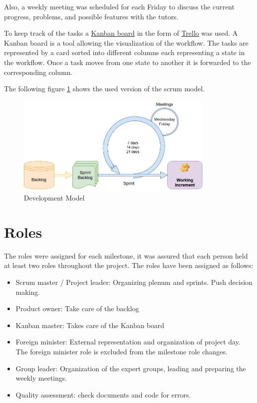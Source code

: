 \documentclass[main.tex]{subfiles}
\begin{document}
	Also, a weekly meeting was scheduled for each Friday to discuss the current progress, problems, and possible features with the tutors.
	
	To keep track of the tasks a \href{https://www.atlassian.com/de/agile/kanban/boards}{Kanban board} in the form of \href{https://trello.com/de}{Trello} was used. A Kanban board is a tool allowing the visualization of the workflow. The tasks are represented by a card sorted into different columns each representing a state in the workflow. Once a task moves from one state to another it is forwarded to the corresponding column.
	
	The following figure \ref{developmentmodel}	shows the used version of the scrum model.
	
	\begin{figure}[h]
		\centering
		\includegraphics[width=0.85\textwidth]{pictures/diagramms/Development-model.png}
		\caption{Development Model}
		\label{developmentmodel}
	\end{figure}

	\section{Roles}
	The roles were assigned for each milestone, it was assured that each person held at least two roles throughout the project. The roles have been assigned as follows:
	\begin{itemize}
		\item Scrum master / Project leader: Organizing plenum and sprints. Push decision making.
		\item Product owner: Take care of the backlog
		\item Kanban master: Takes care of the Kanban board
		\item Foreign minister: External representation and organization of project day. The foreign minister role is excluded from the milestone role changes.
		\item Group leader: Organization of the expert groups, leading and preparing the weekly meetings.
		\item Quality assessment: check documents and code for errors.
	\end{itemize}
	
\end{document}

